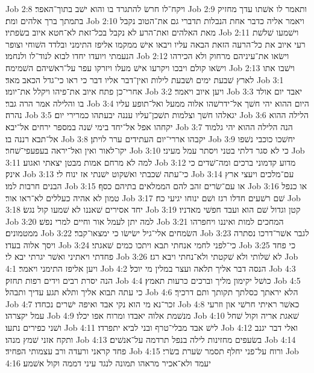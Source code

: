 Job 2:8  ויקח־לו חרשׂ להתגרד בו והוא ישׁב בתוך־האפר׃
Job 2:9  ותאמר לו אשׁתו עדך מחזיק בתמתך ברך אלהים ומת׃
Job 2:10  ויאמר אליה כדבר אחת הנבלות תדברי גם את־הטוב נקבל מאת האלהים ואת־הרע לא נקבל בכל־זאת לא־חטא איוב בשׂפתיו׃
Job 2:11  וישׁמעו שׁלשׁת רעי איוב את כל־הרעה הזאת הבאה עליו ויבאו אישׁ ממקמו אליפז התימני ובלדד השׁוחי וצופר הנעמתי ויועדו יחדו לבוא לנוד־לו ולנחמו׃
Job 2:12  וישׂאו את־עיניהם מרחוק ולא הכירהו וישׂאו קולם ויבכו ויקרעו אישׁ מעלו ויזרקו עפר על־ראשׁיהם השׁמימה׃
Job 2:13  וישׁבו אתו לארץ שׁבעת ימים ושׁבעת לילות ואין־דבר אליו דבר כי ראו כי־גדל הכאב מאד׃
Job 3:1  אחרי־כן פתח איוב את־פיהו ויקלל את־יומו׃
Job 3:2  ויען איוב ויאמר׃
Job 3:3  יאבד יום אולד בו והלילה אמר הרה גבר׃
Job 3:4  היום ההוא יהי חשׁך אל־ידרשׁהו אלוה ממעל ואל־תופע עליו נהרה׃
Job 3:5  יגאלהו חשׁך וצלמות תשׁכן־עליו עננה יבעתהו כמרירי יום׃
Job 3:6  הלילה ההוא יקחהו אפל אל־יחד בימי שׁנה במספר ירחים אל־יבא׃
Job 3:7  הנה הלילה ההוא יהי גלמוד אל־תבא רננה בו׃
Job 3:8  יקבהו אררי־יום העתידים ערר לויתן׃
Job 3:9  יחשׁכו כוכבי נשׁפו יקו־לאור ואין ואל־יראה בעפעפי־שׁחר׃
Job 3:10  כי לא סגר דלתי בטני ויסתר עמל מעיני׃
Job 3:11  למה לא מרחם אמות מבטן יצאתי ואגוע׃
Job 3:12  מדוע קדמוני ברכים ומה־שׁדים כי אינק׃
Job 3:13  כי־עתה שׁכבתי ואשׁקוט ישׁנתי אז ינוח לי׃
Job 3:14  עם־מלכים ויעצי ארץ הבנים חרבות למו׃
Job 3:15  או עם־שׂרים זהב להם הממלאים בתיהם כסף׃
Job 3:16  או כנפל טמון לא אהיה כעללים לא־ראו אור׃
Job 3:17  שׁם רשׁעים חדלו רגז ושׁם ינוחו יגיעי כח׃
Job 3:18  יחד אסירים שׁאננו לא שׁמעו קול נגשׂ׃
Job 3:19  קטן וגדול שׁם הוא ועבד חפשׁי מאדניו׃
Job 3:20  למה יתן לעמל אור וחיים למרי נפשׁ׃
Job 3:21  המחכים למות ואיננו ויחפרהו ממטמונים׃
Job 3:22  השׂמחים אלי־גיל ישׂישׂו כי ימצאו־קבר׃
Job 3:23  לגבר אשׁר־דרכו נסתרה ויסך אלוה בעדו׃
Job 3:24  כי־לפני לחמי אנחתי תבא ויתכו כמים שׁאגתי׃
Job 3:25  כי פחד פחדתי ויאתיני ואשׁר יגרתי יבא לי׃
Job 3:26  לא שׁלותי ולא שׁקטתי ולא־נחתי ויבא רגז׃
Job 4:1  ויען אליפז התימני ויאמר׃
Job 4:2  הנסה דבר אליך תלאה ועצר במלין מי יוכל׃
Job 4:3  הנה יסרת רבים וידים רפות תחזק׃
Job 4:4  כושׁל יקימון מליך וברכים כרעות תאמץ׃
Job 4:5  כי עתה תבוא אליך ותלא תגע עדיך ותבהל׃
Job 4:6  הלא יראתך כסלתך תקותך ותם דרכיך׃
Job 4:7  זכר־נא מי הוא נקי אבד ואיפה ישׁרים נכחדו׃
Job 4:8  כאשׁר ראיתי חרשׁי און וזרעי עמל יקצרהו׃
Job 4:9  מנשׁמת אלוה יאבדו ומרוח אפו יכלו׃
Job 4:10  שׁאגת אריה וקול שׁחל ושׁני כפירים נתעו׃
Job 4:11  לישׁ אבד מבלי־טרף ובני לביא יתפרדו׃
Job 4:12  ואלי דבר יגנב ותקח אזני שׁמץ מנהו׃
Job 4:13  בשׂעפים מחזינות לילה בנפל תרדמה על־אנשׁים׃
Job 4:14  פחד קראני ורעדה ורב עצמותי הפחיד׃
Job 4:15  ורוח על־פני יחלף תסמר שׂערת בשׂרי׃
Job 4:16  יעמד ולא־אכיר מראהו תמונה לנגד עיני דממה וקול אשׁמע׃
